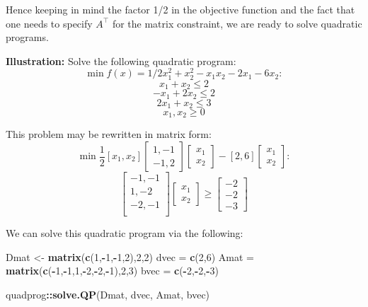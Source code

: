 \documentclass[11pt,]{article}
\newenvironment{Shaded}{\begin{snugshade}}{\end{snugshade}}
\newcommand{\KeywordTok}[1]{\textcolor[rgb]{0.13,0.29,0.53}{\textbf{#1}}}
\newcommand{\DecValTok}[1]{\textcolor[rgb]{0.00,0.00,0.81}{#1}}
\newcommand{\StringTok}[1]{\textcolor[rgb]{0.31,0.60,0.02}{#1}}
\newcommand{\OperatorTok}[1]{\textcolor[rgb]{0.81,0.36,0.00}{\textbf{#1}}}
\newcommand{\NormalTok}[1]{#1}
\begin{document}
Hence keeping in mind the factor 1/2 in the objective function and the
fact that one needs to specify \(A^{\top}\) for the matrix constraint,
we are ready to solve quadratic programs.

\textbf{Illustration:} Solve the following quadratic program:
\[\min f(x)=1/2x_1^2+x_2^2-x_1x_2-2x_1-6x_2:\] \[x_1+x_2\leq 2\]
\[-x_1+2x_2\leq 2\] \[2x_1+x_2\leq 3\] \[x_1, x_2\geq 0\]

This problem may be rewritten in matrix form:
\[\min{} \frac{1}{2}[x_1,x_2]\begin{bmatrix}1,-1\\-1,2\end{bmatrix}
\begin{bmatrix}x_1\\x_2\end{bmatrix}-[2,6]\begin{bmatrix}x_1\\x_2\end{bmatrix}:\]
\[\begin{bmatrix}
-1, -1\\
1, -2\\
-2, -1\\
\end{bmatrix}
\begin{bmatrix}
x_1\\
x_2
\end{bmatrix}\geq
\begin{bmatrix}
-2\\
-2\\
-3
\end{bmatrix}\]

We can solve this quadratic program via the following:

\begin{Shaded}
\begin{Highlighting}[]
\NormalTok{Dmat <-}\StringTok{ }\KeywordTok{matrix}\NormalTok{(}\KeywordTok{c}\NormalTok{(}\DecValTok{1}\NormalTok{,}\OperatorTok{-}\DecValTok{1}\NormalTok{,}\OperatorTok{-}\DecValTok{1}\NormalTok{,}\DecValTok{2}\NormalTok{),}\DecValTok{2}\NormalTok{,}\DecValTok{2}\NormalTok{)}
\NormalTok{dvec =}\StringTok{ }\KeywordTok{c}\NormalTok{(}\DecValTok{2}\NormalTok{,}\DecValTok{6}\NormalTok{)}
\NormalTok{Amat =}\StringTok{ }\KeywordTok{matrix}\NormalTok{(}\KeywordTok{c}\NormalTok{(}\OperatorTok{-}\DecValTok{1}\NormalTok{,}\OperatorTok{-}\DecValTok{1}\NormalTok{,}\DecValTok{1}\NormalTok{,}\OperatorTok{-}\DecValTok{2}\NormalTok{,}\OperatorTok{-}\DecValTok{2}\NormalTok{,}\OperatorTok{-}\DecValTok{1}\NormalTok{),}\DecValTok{2}\NormalTok{,}\DecValTok{3}\NormalTok{)}
\NormalTok{bvec =}\StringTok{ }\KeywordTok{c}\NormalTok{(}\OperatorTok{-}\DecValTok{2}\NormalTok{,}\OperatorTok{-}\DecValTok{2}\NormalTok{,}\OperatorTok{-}\DecValTok{3}\NormalTok{)}

\NormalTok{quadprog}\OperatorTok{::}\KeywordTok{solve.QP}\NormalTok{(Dmat, dvec, Amat, bvec)}
\end{Highlighting}
\end{Shaded}
\end{document}

